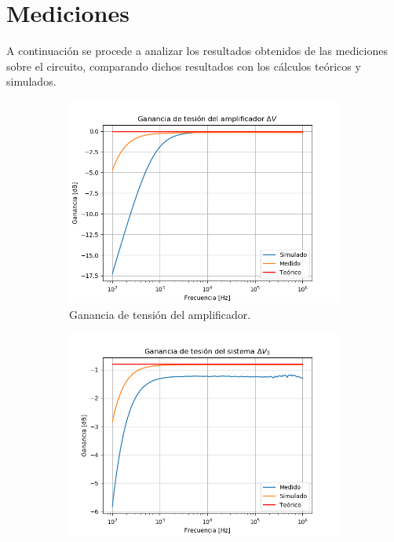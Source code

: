 \section{Mediciones}
A continuación se procede a analizar los resultados obtenidos de las mediciones sobre el circuito, comparando dichos resultados con los cálculos teóricos y simulados.
\begin{figure}[H]
\centering
\begin{subfigure}{.49\textwidth}
\centering
	\includegraphics[width=\textwidth]{Imagenes/Av.png}
	\caption{Ganancia de tensión del amplificador.}
	\label{fig:av}
\end{subfigure}
\begin{subfigure}{.49\textwidth}
\centering
	\includegraphics[width=\textwidth]{Imagenes/Avs.png}

\end{subfigure}
\end{figure}
